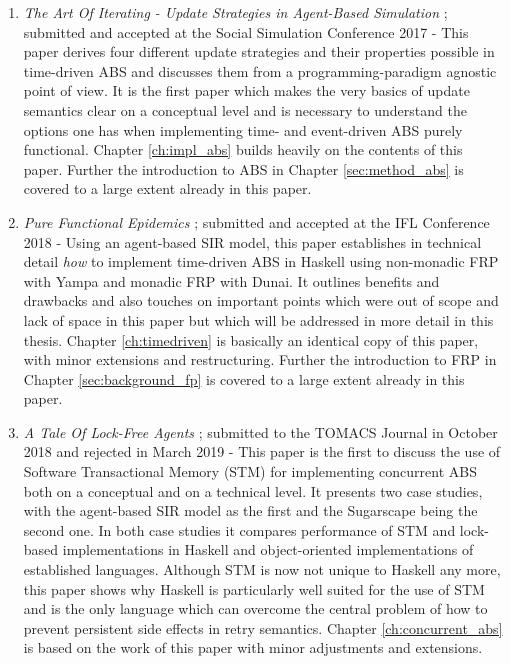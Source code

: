 \begin{enumerate}
	\item \textit{The Art Of Iterating - Update Strategies in Agent-Based Simulation} \cite{thaler_art_2017}; submitted and accepted at the Social Simulation Conference 2017 - This paper derives four different update strategies and their properties possible in time-driven ABS and discusses them from a programming-paradigm agnostic point of view. It is the first paper which makes the very basics of update semantics clear on a conceptual level and is necessary to understand the options one has when implementing time- and event-driven ABS purely functional. Chapter \ref{ch:impl_abs} builds heavily on the contents of this paper. Further the introduction to ABS in Chapter \ref{sec:method_abs} is covered to a large extent already in this paper.
	
	\item \textit{Pure Functional Epidemics} \cite{thaler_pure_2018}; submitted and accepted at the IFL Conference 2018 - Using an agent-based SIR model, this paper establishes in technical detail \textit{how} to implement time-driven ABS in Haskell using non-monadic FRP with Yampa and monadic FRP with Dunai. It outlines benefits and drawbacks and also touches on important points which were out of scope and lack of space in this paper but which will be addressed in more detail in this thesis. Chapter \ref{ch:timedriven} is basically an identical copy of this paper, with minor extensions and restructuring. Further the introduction to FRP in Chapter \ref{sec:background_fp} is covered to a large extent already in this paper.
	
	\item \textit{A Tale Of Lock-Free Agents} \cite{thaler_tale_2018}; submitted to the TOMACS Journal in October 2018 and rejected in March 2019 - This paper is the first to discuss the use of Software Transactional Memory (STM) for implementing concurrent ABS both on a conceptual and on a technical level. It presents two case studies, with the agent-based SIR model as the first and the Sugarscape being the second one. In both case studies it compares performance of STM and lock-based implementations in Haskell and object-oriented implementations of established languages. Although STM is now not unique to Haskell any more, this paper shows why Haskell is particularly well suited for the use of STM and is the only language which can overcome the central problem of how to prevent persistent side effects in retry semantics. Chapter \ref{ch:concurrent_abs} is based on the work of this paper with minor adjustments and extensions.


\end{enumerate}
